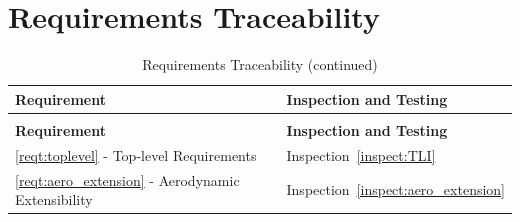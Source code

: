 \section{Requirements Traceability}\label{sec:traceability}

\begin{longtable}[c]{||p{3in}|p{3in}|}
\caption{Requirements Traceability} \\[6pt]
\hline
{\bf Requirement} & {\bf Inspection and Testing} \\
\hline \hline
\endfirsthead
\hline
\endfoot
\caption[]{Requirements Traceability (continued)} \\[6pt]
\hline
{\bf Requirement} & {\bf Inspection and Testing} \\
\hline \hline
\endhead

\ref{reqt:toplevel} - Top-level Requirements &
  Inspection~\ref{inspect:TLI} \\
  \hline

\ref{reqt:aero_extension} - Aerodynamic Extensibility &
   Inspection~\ref{inspect:aero_extension} \\
\hline


\end{longtable}
